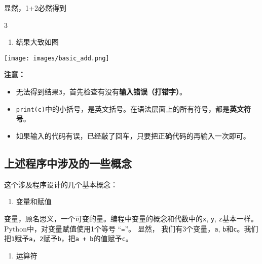 \documentclass[
  letterpaper,
  DIV=11,
  numbers=noendperiod]{scrreprt}
\newenvironment{Shaded}{\begin{snugshade}}{\end{snugshade}}
\newcommand{\DecValTok}[1]{\textcolor[rgb]{0.68,0.00,0.00}{#1}}
\providecommand{\tightlist}{%
  \setlength{\itemsep}{0pt}\setlength{\parskip}{0pt}}\usepackage{longtable,booktabs,array}
\begin{document}
显然，1+2必然得到

\begin{Shaded}
\begin{Highlighting}[]
\DecValTok{3}
\end{Highlighting}
\end{Shaded}

\begin{enumerate}
\def\labelenumi{\arabic{enumi}.}
\setcounter{enumi}{1}
\tightlist
\item
  结果大致如图
\end{enumerate}

\texttt{[image: images/basic\_add.png]}

{\textbf{注意：}}

\begin{itemize}
\tightlist
\item
  无法得到结果\texttt{3}，首先检查有没有\textbf{输入错误（打错字）}。
\item
  \texttt{print(c)}中的小括号，是英文括号。在语法层面上的所有符号，都是\textbf{英文符号}。
\item
  如果输入的代码有误，已经敲了回车，只要把正确代码的再输入一次即可。
\end{itemize}

\hypertarget{ux4e0aux8ff0ux7a0bux5e8fux4e2dux6d89ux53caux7684ux4e00ux4e9bux6982ux5ff5}{%
\subsection{上述程序中涉及的一些概念}\label{ux4e0aux8ff0ux7a0bux5e8fux4e2dux6d89ux53caux7684ux4e00ux4e9bux6982ux5ff5}}

这个涉及程序设计的几个基本概念：

\begin{enumerate}
\def\labelenumi{\arabic{enumi}.}
\tightlist
\item
  变量和赋值
\end{enumerate}

变量，顾名思义，一个可变的量。编程中变量的概念和代数中的\texttt{x},
\texttt{y}, \texttt{z}基本一样。 Python中，对变量赋值使用1个等号
``\texttt{=}''。 显然， 我们有3个变量，\texttt{a},
\texttt{b}和\texttt{c}。我们把\texttt{1}赋予\texttt{a}，\texttt{2}赋予\texttt{b}，把\texttt{a\ +\ b}的值赋予\texttt{c}。

\begin{enumerate}
\def\labelenumi{\arabic{enumi}.}
\setcounter{enumi}{1}
\tightlist
\item
  运算符
\end{enumerate}
\end{document}
